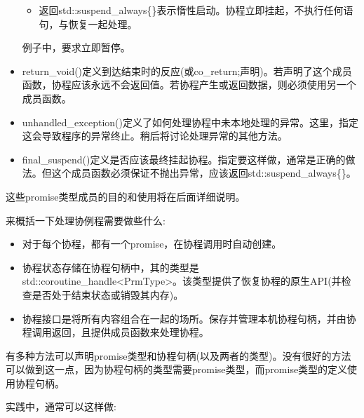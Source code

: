 \begin{itemize}
\begin{itemize}
\item
返回std::suspend\_always\{\}表示惰性启动。协程立即挂起，不执行任何语句，与恢复一起处理。
\end{itemize}

例子中，要求立即暂停。

\item
return\_void()定义到达结束时的反应(或co\_return;声明)。若声明了这个成员函数，协程应该永远不会返回值。若协程产生或返回数据，则必须使用另一个成员函数。

\item
unhandled\_exception()定义了如何处理协程中未本地处理的异常。这里，指定这会导致程序的异常终止。稍后将讨论处理异常的其他方法。

\item
final\_suspend()定义是否应该最终挂起协程。指定要这样做，通常是正确的做法。但这个成员函数必须保证不抛出异常，应该返回std::suspend\_always\{\}。
\end{itemize}

这些promise类型成员的目的和使用将在后面详细说明。


来概括一下处理协例程需要做些什么:

\begin{itemize}
\item
对于每个协程，都有一个promise，在协程调用时自动创建。

\item
协程状态存储在协程句柄中，其的类型是std::coroutine\_handle<PrmType>。该类型提供了恢复协程的原生API(并检查是否处于结束状态或销毁其内存)。

\item
协程接口是将所有内容组合在一起的场所。保存并管理本机协程句柄，并由协程调用返回，且提供成员函数来处理协程。
\end{itemize}

有多种方法可以声明promise类型和协程句柄(以及两者的类型)。没有很好的方法可以做到这一点，因为协程句柄的类型需要promise类型，而promise类型的定义使用协程句柄。

实践中，通常可以这样做:

